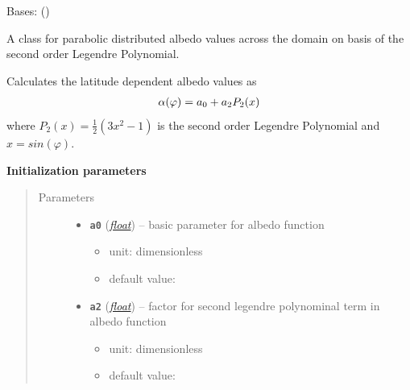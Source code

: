 \documentclass[a4paper,10pt,english]{sphinxmanual}
\begin{document}
\begin{fulllineitems}
\label{api/climlab.surface:climlab.surface.albedo.P2Albedo}
Bases: {\hyperref[api/climlab.process:climlab.process.diagnostic.DiagnosticProcess]{\emph{}}} ()

A class for parabolic distributed albedo values across the domain 
on basis of the second order Legendre Polynomial.

Calculates the latitude dependent albedo values as
\begin{gather}
\begin{split}\alpha(\varphi) = a_0 + a_2 P_2(x)\end{split}\notag
\end{gather}
where \(P_2(x) = \frac{1}{2} (3x^2 - 1)\) is the second order Legendre Polynomial
and \(x=sin(\varphi)\).

\textbf{Initialization parameters}
\begin{quote}\begin{description}
\item[{Parameters}] \leavevmode\begin{itemize}
\item {} 
\textbf{\texttt{a0}} (\href{http://docs.python.org/2.7/library/functions.html\#float}{\emph{float}}) -- 
basic parameter for albedo function
\begin{itemize}
\item {} 
unit: dimensionless

\item {} 
default value: 

\end{itemize}


\item {} 
\textbf{\texttt{a2}} (\href{http://docs.python.org/2.7/library/functions.html\#float}{\emph{float}}) -- 
factor for second legendre polynominal term in albedo function
\begin{itemize}
\item {} 
unit: dimensionless

\item {} 
default value: 

\end{itemize}


\end{itemize}


\end{description}
\end{quote}
\end{fulllineitems}
\end{document}
